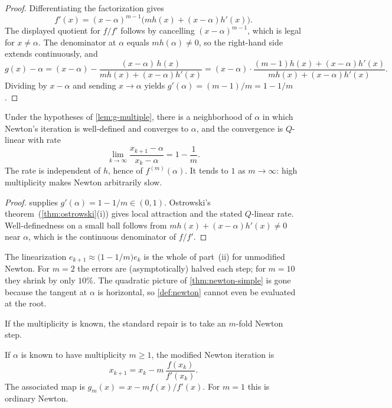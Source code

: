 \begin{proof}
Differentiating the factorization gives
\[
f'(x)
=
(x-\alpha)^{m-1}\bigl(m h(x)+(x-\alpha)h'(x)\bigr).
\]
The displayed quotient for \(f/f'\) follows by cancelling \((x-\alpha)^{m-1}\), which is legal for \(x\neq\alpha\). The denominator at \(\alpha\) equals \(m h(\alpha)\neq 0\), so the right-hand side extends continuously, and
\[
g(x)-\alpha
=
(x-\alpha)
-
\frac{(x-\alpha)\,h(x)}{m h(x)+(x-\alpha)h'(x)}
=
(x-\alpha)\cdot
\frac{(m-1)h(x)+(x-\alpha)h'(x)}{m h(x)+(x-\alpha)h'(x)}.
\]
Dividing by \(x-\alpha\) and sending \(x\to\alpha\) yields \(g'(\alpha)=(m-1)/m=1-1/m\).
\end{proof}

\begin{theorem}
\label{thm:newton-multiple}
Under the hypotheses of \cref{lem:g-multiple}, there is a neighborhood of \(\alpha\) in which Newton's iteration is well-defined and converges to \(\alpha\), and the convergence is \(Q\)-linear with rate
\[
\lim_{k\to\infty}
\frac{x_{k+1}-\alpha}{x_k-\alpha}
=
1-\frac{1}{m}.
\]
The rate is independent of \(h\), hence of \(f^{(m)}(\alpha)\). It tends to \(1\) as \(m\to\infty\): high multiplicity makes Newton arbitrarily slow.
\end{theorem}

\begin{proof}
 supplies \(g'(\alpha)=1-1/m\in(0,1)\). Ostrowski's theorem~(\cref{thm:ostrowski}(i)) gives local attraction and the stated \(Q\)-linear rate. Well-definedness on a small ball follows from \(m h(x)+(x-\alpha)h'(x)\neq 0\) near \(\alpha\), which is the continuous denominator of \(f/f'\).
\end{proof}

The linearization \(e_{k+1}\approx\bigl(1-1/m\bigr)e_k\) is the whole of part~(ii) for unmodified Newton. For \(m=2\) the errors are (asymptotically) halved each step; for \(m=10\) they shrink by only \(10\%\). The quadratic picture of \cref{thm:newton-simple} is gone because the tangent at \(\alpha\) is horizontal, so \cref{def:newton} cannot even be evaluated at the root.

If the multiplicity is known, the standard repair is to take an \(m\)-fold Newton step.

\begin{definition}
\label{def:modified-newton}
If \(\alpha\) is known to have multiplicity \(m\ge 1\), the modified Newton iteration is
\begin{equation}
\label{eq:modified-newton}
x_{k+1}
=
x_k
-
m\,\frac{f(x_k)}{f'(x_k)}.
\end{equation}
The associated map is \(g_m(x)=x-m f(x)/f'(x)\). For \(m=1\) this is ordinary Newton.
\end{definition}

